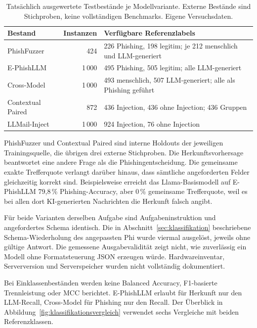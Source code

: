 \documentclass[12pt,twoside=false,a4paper,parskip]{scrbook}
\begin{document}
\begin{table}[htbp]
\centering\small
\caption{Tatsächlich ausgewertete Testbestände je Modellvariante. Externe Bestände sind Stichproben, keine vollständigen Benchmarks. Eigene Versuchsdaten.}
\label{tab:tatsaechliche-testbestaende}
\begin{tabular}{p{.32\linewidth}rp{.43\linewidth}}
\toprule
Bestand & Instanzen & Verfügbare Referenzlabels \\
\midrule
PhishFuzzer & 424 & 226 Phishing, 198 legitim; je 212 menschlich und LLM-generiert \\
E-PhishLLM & 1\,000 & 495 Phishing, 505 legitim; alle LLM-generiert \\
Cross-Model & 1\,000 & 493 menschlich, 507 LLM-generiert; alle als Phishing geführt \\
Contextual Paired & 872 & 436 Injection, 436 ohne Injection; 436 Gruppen \\
LLMail-Inject & 1\,000 & 924 Injection, 76 ohne Injection \\
\bottomrule
\end{tabular}
\end{table}

PhishFuzzer und Contextual Paired sind interne Holdouts der jeweiligen Trainingsquelle, die übrigen drei externe Stichproben. Die Herkunftsvorhersage beantwortet eine andere Frage als die Phishingentscheidung. Die gemeinsame exakte Trefferquote verlangt darüber hinaus, dass sämtliche angeforderten Felder gleichzeitig korrekt sind. Beispielsweise erreicht das Llama-Basismodell auf E-PhishLLM 79{,}8\,\% Phishing-Accuracy, aber 0\,\% gemeinsame Trefferquote, weil es bei allen dort KI-generierten Nachrichten die Herkunft falsch angibt.

Für beide Varianten derselben Aufgabe sind Aufgabeninstruktion und angefordertes Schema identisch. Die in Abschnitt~\ref{sec:klassifikation} beschriebene Schema-Wiederholung des angepassten Phi wurde viermal ausgelöst, jeweils ohne gültige Antwort. Die gemessene Ausgabevalidität zeigt nicht, wie zuverlässig ein Modell ohne Formatsteuerung JSON erzeugen würde. Hardwareinventar, Serverversion und Serverspeicher wurden nicht vollständig dokumentiert.

Bei Einklassenbeständen werden keine Balanced Accuracy, F1-basierte Trennleistung oder MCC berichtet. E-PhishLLM erlaubt für Herkunft nur den LLM-Recall, Cross-Model für Phishing nur den Recall. Der Überblick in Abbildung~\ref{fig:klassifikationsvergleich} verwendet sechs Vergleiche mit beiden Referenzklassen.
\end{document}
